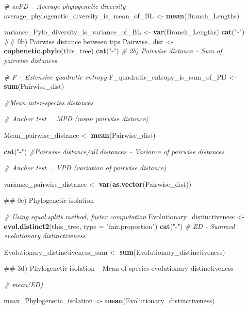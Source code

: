 \documentclass[]{book}
\newenvironment{Shaded}{\begin{snugshade}}{\end{snugshade}}
\newcommand{\KeywordTok}[1]{\textcolor[rgb]{0.13,0.29,0.53}{\textbf{{#1}}}}
\newcommand{\DataTypeTok}[1]{\textcolor[rgb]{0.13,0.29,0.53}{{#1}}}
\newcommand{\StringTok}[1]{\textcolor[rgb]{0.31,0.60,0.02}{{#1}}}
\newcommand{\CommentTok}[1]{\textcolor[rgb]{0.56,0.35,0.01}{\textit{{#1}}}}
\newcommand{\NormalTok}[1]{{#1}}
\theoremstyle{definition}
\theoremstyle{definition}
\theoremstyle{remark}
\begin{document}
\begin{Shaded}
\begin{Highlighting}[]
{    \CommentTok{# avPD -- Average phylogenetic diversity}
\NormalTok{    average_phylogenetic_diversity_is_mean_of_BL <-}\StringTok{ }\KeywordTok{mean}\NormalTok{(Branch_Lengths)}

\NormalTok{    variance_Pylo_diversity_is_variance_of_BL <-}\StringTok{ }\KeywordTok{var}\NormalTok{(Branch_Lengths)}
    \KeywordTok{cat}\NormalTok{(}\StringTok{"-"}\NormalTok{)}
\NormalTok{    ## 0b) Pairwise distance between tips}
\NormalTok{    Pairwise_dist <-}\StringTok{ }\KeywordTok{cophenetic.phylo}\NormalTok{(this_tree)}
    \KeywordTok{cat}\NormalTok{(}\StringTok{"-"}\NormalTok{)}
    \CommentTok{# 2b) Pairwise distance -- Sum of pairwise distances}

    \CommentTok{# F -- Extensive quadratic entropy}
\NormalTok{    F_quadratic_entropy_is_sum_of_PD <-}\StringTok{ }\KeywordTok{sum}\NormalTok{(Pairwise_dist)}

    \CommentTok{#Mean inter-species distances}

    \CommentTok{# Anchor test = MPD (mean pairwise distance)}

\NormalTok{    Mean_pairwise_distance <-}\StringTok{ }\KeywordTok{mean}\NormalTok{(Pairwise_dist)}

    \KeywordTok{cat}\NormalTok{(}\StringTok{"-"}\NormalTok{)}
    \CommentTok{#Pairwise distance/all distances -- Variance of pairwise distances}

    \CommentTok{# Anchor test = VPD (variation of pairwise distance)}

\NormalTok{    variance_pairwise_distance <-}\StringTok{ }\KeywordTok{var}\NormalTok{(}\KeywordTok{as.vector}\NormalTok{(Pairwise_dist))}

\NormalTok{    ## 0c) Phylogenetic isolation}

    \CommentTok{# Using equal.splits method, faster computation}
\NormalTok{    Evolutionary_distinctiveness <-}\StringTok{ }\KeywordTok{evol.distinct2}\NormalTok{(this_tree, }\DataTypeTok{type =} \StringTok{"fair.proportion"}\NormalTok{)}
    \KeywordTok{cat}\NormalTok{(}\StringTok{"-"}\NormalTok{)}
    \CommentTok{# ED - Summed evolutionary distinctiveness}

\NormalTok{    Evolutionary_distinctiveness_sum <-}\StringTok{ }\KeywordTok{sum}\NormalTok{(Evolutionary_distinctiveness)}

\NormalTok{    ## 3d) Phylogenetic isolation -- Mean of species evolutionary distinctiveness}

    \CommentTok{# mean(ED)}

\NormalTok{    mean_Phylogenetic_isolation <-}\StringTok{ }\KeywordTok{mean}\NormalTok{(Evolutionary_distinctiveness)}

}
\end{Highlighting}
\end{Shaded}
\end{document}
